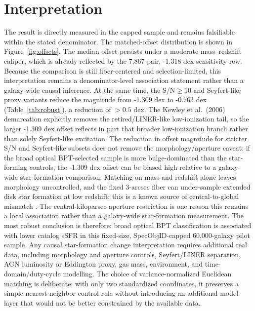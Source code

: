 \documentclass[twocolumn]{aastex631}
\begin{document}
\section{Interpretation}
The result is directly measured in the capped sample and remains falsifiable within the stated denominator. The matched-offset distribution is shown in Figure~\ref{fig:offsets}. The median offset persists under a moderate mass--redshift caliper, which is already reflected by the 7,867-pair, -1.318 dex sensitivity row. Because the comparison is still fiber-centered and selection-limited, this interpretation remains a denominator-level association statement rather than a galaxy-wide causal inference. At the same time, the S/N$\geq10$ and Seyfert-like proxy variants reduce the magnitude from -1.309 dex to -0.763 dex (Table~\ref{tab:robust}), a reduction of $>0.5$ dex. The Kewley et al.\ (2006) demarcation explicitly removes the retired/LINER-like low-ionization tail, so the larger -1.309 dex offset reflects in part that broader low-ionization branch rather than solely Seyfert-like excitation. The reduction in offset magnitude for stricter S/N and Seyfert-like subsets does not remove the morphology/aperture caveat: if the broad optical BPT-selected sample is more bulge-dominated than the star-forming controls, the -1.309 dex offset can be biased high relative to a galaxy-wide star-formation comparison. Matching on mass and redshift alone leaves morphology uncontrolled, and the fixed 3-arcsec fiber can under-sample extended disk star formation at low redshift; this is a known source of central-to-global mismatch \citep[e.g.,][]{harrison2017,ellison2021}. The central-kiloparsec aperture restriction is one reason this remains a local association rather than a galaxy-wide star-formation measurement. The most robust conclusion is therefore: broad optical BPT classification is associated with lower catalog sSFR in this fixed-size, SpecObjID-capped 60,000-galaxy pilot sample. Any causal star-formation change interpretation requires additional real data, including morphology and aperture controls, Seyfert/LINER separation, AGN luminosity or Eddington proxy, gas mass, environment, and time-domain/duty-cycle modelling.
The choice of variance-normalized Euclidean matching is deliberate: with only two standardized coordinates, it preserves a simple nearest-neighbor control rule without introducing an additional model layer that would not be better constrained by the available data.
\end{document}
